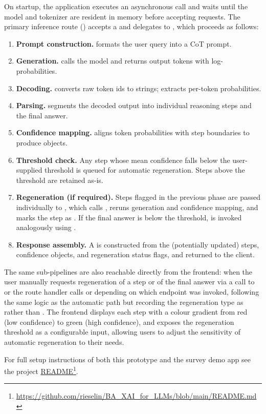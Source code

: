 On startup, the application executes an asynchronous  call and waits
until the model and tokenizer are resident in memory before accepting requests. The
primary inference route () accepts a  and
delegates to , which proceeds as follows:
 
\begin{enumerate}
  \item \textbf{Prompt construction.}  formats the user
        query into a CoT prompt.
  \item \textbf{Generation.}  calls the model and returns
        output tokens with log-probabilities.
  \item \textbf{Decoding.}  converts raw token ids to
        strings;  extracts per-token probabilities.
  \item \textbf{Parsing.}  segments the decoded output into
        individual reasoning steps and the final answer.
  \item \textbf{Confidence mapping.}  aligns token
        probabilities with step boundaries to produce  objects.
  \item \textbf{Threshold check.} Any step whose mean confidence falls below the
        user-supplied threshold is queued for automatic regeneration. Steps above the
        threshold are retained as-is.
  \item \textbf{Regeneration (if required).} Steps flagged in the previous phase are
        passed individually to , which calls
        , reruns generation and confidence mapping,
        and marks the step as . If the final answer is below the threshold,
         is invoked analogously using
        .
  \item \textbf{Response assembly.} A  is constructed from the
        (potentially updated) steps, confidence objects, and regeneration status flags, and
        returned to the client.
\end{enumerate}
 
The same sub-pipelines are also reachable directly from the frontend: when the user
manually requests regeneration of a step or of the final answer via a call to
 or  the route handler calls
 or 
depending on which endpoint was invoked, following the same logic as the automatic path but recording the regeneration type as  rather than . The frontend displays
each step with a colour gradient from red
(low confidence) to green (high confidence), and exposes the regeneration threshold as a
configurable input, allowing users to adjust the sensitivity of automatic regeneration to
their needs.
 
For full setup instructions of both this prototype and the survey demo app see the project \href{https://github.com/rieselin/BA_XAI_for_LLMs/blob/main/README.md}{\underline{README}}\footnote{\url{https://github.com/rieselin/BA_XAI_for_LLMs/blob/main/README.md}}.